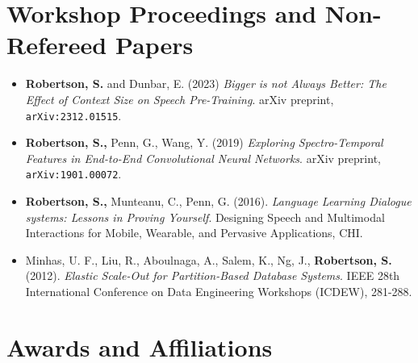 \documentclass[11pt,a4paper,sans]{moderncv}        %
\begin{document}
\section{Workshop Proceedings and Non-Refereed Papers}
\begin{itemize}
  \item \textbf{Robertson, S.} and Dunbar, E. (2023) \textit{Bigger is not
    Always Better: The Effect of Context Size on Speech Pre-Training}. arXiv
    preprint, \texttt{arXiv:2312.01515}.

  \item \textbf{Robertson, S.,} Penn, G., Wang, Y. (2019) \textit{Exploring
    Spectro-Temporal Features in End-to-End Convolutional Neural Networks}.
    arXiv preprint, \texttt{arXiv:1901.00072}.

  \item \textbf{Robertson, S.,} Munteanu, C., Penn, G. (2016).
    \textit{Language Learning Dialogue systems: Lessons in Proving Yourself}.
    Designing Speech and Multimodal Interactions for Mobile, Wearable, and
    Pervasive Applications, CHI.

  \item Minhas, U. F., Liu, R., Aboulnaga, A., Salem, K., Ng, J.,
    \textbf{Robertson, S.} (2012). \textit{Elastic Scale-Out for
    Partition-Based Database Systems}. IEEE 28th International Conference on
    Data Engineering Workshops (ICDEW), 281-288.
\end{itemize}


% 
% 

\section{Awards and Affiliations}

\end{document}
